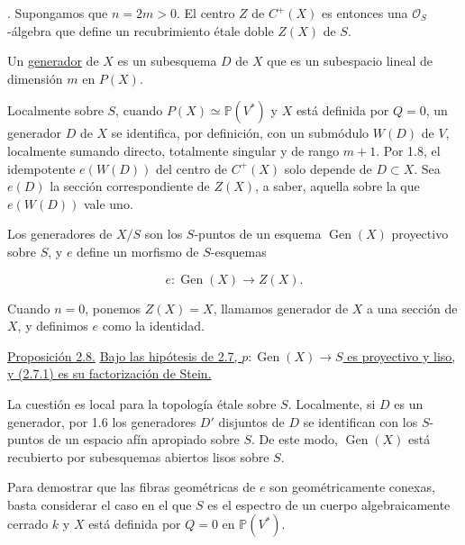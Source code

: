 \medskip
{}. Supongamos que $n=2m>0$. El centro $Z$ de $C^+(X)$ es
entonces una $\mathcal O_S$-álgebra que define un recubrimiento étale doble
$Z(X)$ de $S$.

Un \underline{generador} de $X$ es un subesquema $D$ de $X$ que es un
subespacio lineal de dimensión $m$ en $P(X)$.

Localmente sobre $S$, cuando $P(X)\simeq\mathbb P(V^*)$ y $X$ está definida
por $Q=0$, un generador $D$ de $X$ se identifica, por definición, con un
submódulo $W(D)$ de $V$, localmente sumando directo, totalmente singular y
de rango $m+1$. Por 1.8, el idempotente $e(W(D))$ del centro de $C^+(X)$
solo depende de $D\subset X$. Sea $e(D)$ la sección correspondiente de
$Z(X)$, a saber, aquella sobre la que $e(W(D))$ vale uno.

Los generadores de $X/S$ son los $S$-puntos de un esquema
$\operatorname{Gen}(X)$ proyectivo sobre $S$, y $e$ define un morfismo de
$S$-esquemas

\begin{equation}\tag{2.7.1}
e:\operatorname{Gen}(X)\longrightarrow Z(X).
\end{equation}

Cuando $n=0$, ponemos $Z(X)=X$, llamamos generador de $X$ a una sección de
$X$, y definimos $e$ como la identidad.

\pageoriginale

\medskip
\noindent\underline{Proposición 2.8.}\quad
\underline{Bajo las hipótesis de 2.7,
$p:\operatorname{Gen}(X)\longrightarrow S$ es proyectivo y liso, y
(2.7.1) es su factorización de Stein.}

La cuestión es local para la topología étale sobre $S$. Localmente, si $D$
es un generador, por 1.6 los generadores $D'$ disjuntos de $D$ se
identifican con los $S$-puntos de un espacio afín apropiado sobre $S$. De
este modo, $\operatorname{Gen}(X)$ está recubierto por subesquemas abiertos
lisos sobre $S$.

Para demostrar que las fibras geométricas de $e$ son geométricamente
conexas, basta considerar el caso en el que $S$ es el espectro de un cuerpo
algebraicamente cerrado $k$ y $X$ está definida por $Q=0$ en
$\mathbb P(V^*)$.


